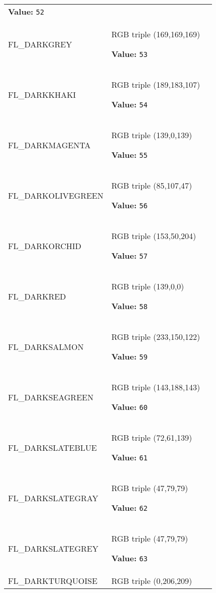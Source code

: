 \begin{longtable}{|p{\varnamewidth}|p{\vardescrwidth}|l}
\textbf{Value:} 
{\tt 52}&\\
\cline{1-2}
\raggedright F\-L\-\_\-D\-A\-R\-K\-G\-R\-E\-Y\- & \raggedright RGB triple (169,169,169)

\textbf{Value:} 
{\tt 53}&\\
\cline{1-2}
\raggedright F\-L\-\_\-D\-A\-R\-K\-K\-H\-A\-K\-I\- & \raggedright RGB triple (189,183,107)

\textbf{Value:} 
{\tt 54}&\\
\cline{1-2}
\raggedright F\-L\-\_\-D\-A\-R\-K\-M\-A\-G\-E\-N\-T\-A\- & \raggedright RGB triple (139,0,139)

\textbf{Value:} 
{\tt 55}&\\
\cline{1-2}
\raggedright F\-L\-\_\-D\-A\-R\-K\-O\-L\-I\-V\-E\-G\-R\-E\-E\-N\- & \raggedright RGB triple (85,107,47)

\textbf{Value:} 
{\tt 56}&\\
\cline{1-2}
\raggedright F\-L\-\_\-D\-A\-R\-K\-O\-R\-C\-H\-I\-D\- & \raggedright RGB triple (153,50,204)

\textbf{Value:} 
{\tt 57}&\\
\cline{1-2}
\raggedright F\-L\-\_\-D\-A\-R\-K\-R\-E\-D\- & \raggedright RGB triple (139,0,0)

\textbf{Value:} 
{\tt 58}&\\
\cline{1-2}
\raggedright F\-L\-\_\-D\-A\-R\-K\-S\-A\-L\-M\-O\-N\- & \raggedright RGB triple (233,150,122)

\textbf{Value:} 
{\tt 59}&\\
\cline{1-2}
\raggedright F\-L\-\_\-D\-A\-R\-K\-S\-E\-A\-G\-R\-E\-E\-N\- & \raggedright RGB triple (143,188,143)

\textbf{Value:} 
{\tt 60}&\\
\cline{1-2}
\raggedright F\-L\-\_\-D\-A\-R\-K\-S\-L\-A\-T\-E\-B\-L\-U\-E\- & \raggedright RGB triple (72,61,139)

\textbf{Value:} 
{\tt 61}&\\
\cline{1-2}
\raggedright F\-L\-\_\-D\-A\-R\-K\-S\-L\-A\-T\-E\-G\-R\-A\-Y\- & \raggedright RGB triple (47,79,79)

\textbf{Value:} 
{\tt 62}&\\
\cline{1-2}
\raggedright F\-L\-\_\-D\-A\-R\-K\-S\-L\-A\-T\-E\-G\-R\-E\-Y\- & \raggedright RGB triple (47,79,79)

\textbf{Value:} 
{\tt 63}&\\
\cline{1-2}
\raggedright F\-L\-\_\-D\-A\-R\-K\-T\-U\-R\-Q\-U\-O\-I\-S\-E\- & \raggedright RGB triple (0,206,209)


\end{longtable}
